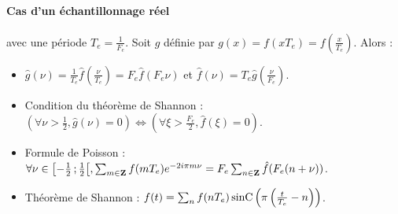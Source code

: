 \paragraph{Cas d'un échantillonnage réel} avec une période $T_e = \frac{1}{F_e}$.
	Soit $g$ définie par $g(x) = f(x T_e) = f \left( \frac{x}{T_e} \right)$.
	Alors :
	\begin{itemize}
	\item[\textbullet] $\hat{g}(\nu) = \frac{1}{T_e} \hat{f} \left( \frac{\nu}{T_e} \right) = F_e \hat{f}(F_e \nu)$ et $\hat{f}(\nu) = T_e \hat{g} \left( \frac{\nu}{F_e} \right)$.
	\item[\textbullet] Condition du théorème de Shannon :
		$\left( \forall \nu >\frac{1}{2}, \hat{g}(\nu) = 0 \right) \iff \left( \forall \xi >\frac{F_e}{2}, \hat{f}(\xi) = 0 \right)$.
	\item[\textbullet] Formule de Poisson : $\forall \nu \in \mathopen{}\mathclose{\left[-\frac{1}{2}\mathclose{}\mathpunct{};\frac{1}{2}\right[}, \sum_{m \in \mathbf{Z}} f(mT_e) e^{-2i\pi m \nu} = F_e \sum_{n \in \mathbf{Z}} \hat{f}(F_e (n + \nu))$.
	\item[\textbullet] Théorème de Shannon :
		$f(t) = \sum_n f(nT_e) \operatorname{sinC} \left( \pi \left( \frac{t}{T_e} - n \right) \right)$.
	\end{itemize}
	